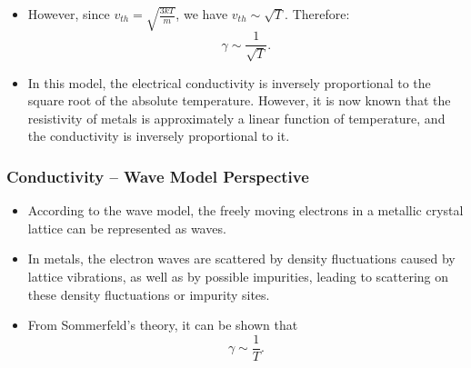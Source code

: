 \documentclass[t,aspectratio=169]{beamer}
\begin{document}
\begin{frame}
\begin{itemize}
$$\gamma=\frac{1}{\rho}=\frac{J}{E}=\frac{n\cdot e\cdot v_{avg}}{E}=\frac{n\cdot e\cdot \frac{eE}{2m}\cdot\frac{l_{k}}{v_{th}}}{E},$$  
that is,  
$$\gamma=\frac{n\cdot e^{2}\cdot l_{k}}{2m v_{th}} \Rightarrow \gamma \sim \frac{1}{v_{th}}.$$
\item However, since $v_{th} =\sqrt{\frac{3kT}{m}}$, we have $v_{th}\sim\sqrt{T}$. Therefore:  
$$\gamma\sim\frac{1}{\sqrt{T}}.$$
\item In this model, the electrical conductivity is inversely proportional to the square root of the absolute temperature. However, it is now known that the resistivity of metals is approximately a linear function of temperature, and the conductivity is inversely proportional to it.
\end{itemize}
\end{frame}


\begin{frame}
\frametitle{Conductivity -- Wave Model Perspective}
\begin{itemize}
\item According to the wave model, the freely moving electrons in a metallic crystal lattice can be represented as waves.
\item In metals, the electron waves are scattered by density fluctuations caused by lattice vibrations, as well as by possible impurities, leading to scattering on these density fluctuations or impurity sites.
\item From Sommerfeld’s theory, it can be shown that  
$$\gamma \sim \frac{1}{T}.$$
\end{itemize}
\end{frame}


\end{document}
